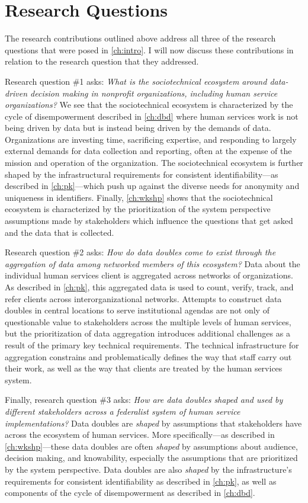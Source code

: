 \section{Research Questions}

The research contributions outlined above address all three of the research questions that were posed in \autoref{ch:intro}. I will now discuss these contributions in relation to the research question that they addressed.

Research question \#1 asks: \emph{What is the sociotechnical ecosystem around data-driven decision making in nonprofit organizations, including human service organizations?} We see that the sociotechnical ecosystem is characterized by the cycle of disempowerment described in \autoref{ch:dbd} where human services work is not being driven by data but is instead being driven by the demands of data. Organizations are investing time, sacrificing expertise, and responding to largely external demands for data collection and reporting, often at the expense of the mission and operation of the organization. The sociotechnical ecosystem is further shaped by the infrastructural requirements for consistent identifiability---as described in \autoref{ch:pk}---which push up against the diverse needs for anonymity and uniqueness in identifiers. Finally, \autoref{ch:wkshp} shows that the sociotechnical ecosystem is characterized by the prioritization of the system perspective assumptions made by stakeholders which influence the questions that get asked and the data that is collected.

Research question \#2 asks: \emph{How do data doubles come to exist through the aggregation of data among networked members of this ecosystem?} Data about the individual human services client is aggregated across networks of organizations. As described in \autoref{ch:pk}, this aggregated data is used to count, verify, track, and refer clients across interorganizational networks. Attempts to construct data doubles in central locations to serve institutional agendas are not only of questionable value to stakeholders across the multiple levels of human services, but the prioritization of data aggregation introduces additional challenges as a result of the primary key technical requirements. The technical infrastructure for aggregation constrains and problematically defines the way that staff carry out their work, as well as the way that clients are treated by the human services system.

Finally, research question \#3 asks: \emph{How are data doubles shaped and used by different stakeholders across a federalist system of human service implementations?} Data doubles are \emph{shaped} by assumptions that stakeholders have across the ecosystem of human services. More specifically---as described in \autoref{ch:wkshp}---these data doubles are often \emph{shaped} by assumptions about audience, decision making, and knowability, especially the assumptions that are prioritized by the system perspective. Data doubles are also \emph{shaped} by the infrastructure's requirements for consistent identifiability as described in \autoref{ch:pk}, as well as components of the cycle of disempowerment as described in \autoref{ch:dbd}.

